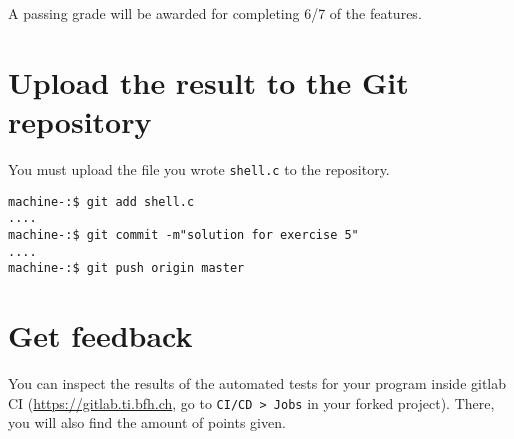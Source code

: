 \documentclass{scrartcl}
\begin{document}
A passing grade will be awarded for completing 6/7 of the features.


\section{Upload the result to the Git repository}
You must upload the file you wrote \texttt{shell.c} to the repository.

\begin{lstlisting}
machine-:$ git add shell.c
....
machine-:$ git commit -m"solution for exercise 5"
....
machine-:$ git push origin master
\end{lstlisting}%

\section{Get feedback}
You can inspect the results of the automated tests for your program inside gitlab CI (\url{https://gitlab.ti.bfh.ch}, go to \texttt{CI/CD > Jobs} in your forked project). There, you will also find the amount of points given.
\end{document}
